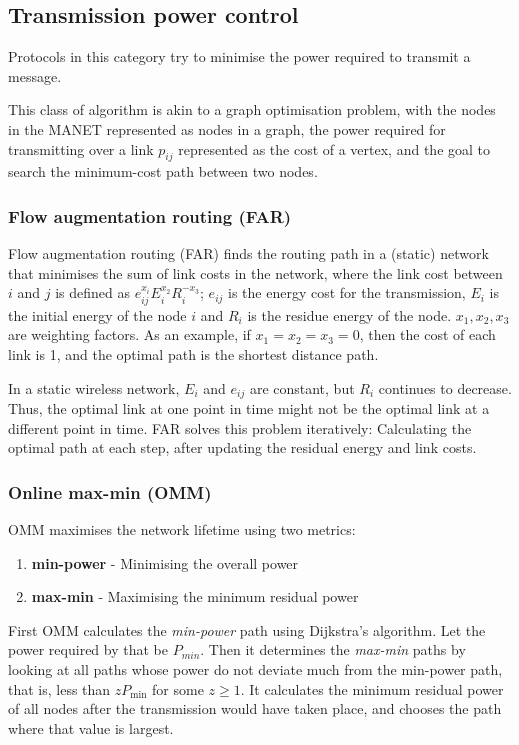 \subsection{Transmission power control}
\label{power-control}
Protocols in this category try to minimise the power required to transmit
a message.

This class of algorithm is akin to a graph optimisation problem,
with the nodes in the MANET represented as nodes in a graph, the power required for
transmitting over a link $p_{ij}$ represented as the cost of a vertex, and the goal
to search the minimum-cost path between two nodes.

\subsubsection{Flow augmentation routing (FAR)}
Flow augmentation routing (FAR)\cite{chang2000energy} finds the routing
path in a (static) network that minimises the sum of link costs in the network,
where the link cost between $i$ and $j$ is defined as \( e_{ij}^{x_{i}}E_{i}^{x_{2}}R_{i}^{-x_{3}}\);
\(e_{ij}\) is the energy cost for the transmission, $E_{i}$ is the initial energy
of the node $i$ and $R_{i}$ is the residue energy of the node. \(x_{1}, x_{2}, x_{3}\)
are weighting factors. As an example, if $x_{1}=x_{2}=x_{3}=0$, then the cost
of each link is 1, and the optimal path is the shortest distance path.

In a static wireless network, $E_{i}$ and $e_{ij}$ are constant, but $R_{i}$
continues to decrease. Thus, the optimal link at one point in time might not be the
optimal link at a different point in time. FAR solves this problem iteratively:
Calculating the optimal path at each step, after updating the residual energy
and link costs.

\subsubsection{Online max-min (OMM)}
\label{omm}
OMM \cite{li2001online} maximises the network lifetime using two metrics:
\begin{enumerate}
  \item \textbf{min-power} - Minimising the overall power
  \item \textbf{max-min} - Maximising the minimum residual power
\end{enumerate}

First OMM calculates the \textit{min-power} path using Dijkstra’s algorithm. Let
the power required by that be $P_{min}$.
Then it determines the \textit{max-min} paths by looking at all paths whose
power do not deviate much from the min-power path, that is, less than $zP_{\min}$
for some $z \ge 1$. It calculates the minimum residual power of all nodes
after the transmission would have taken place, and chooses the path where
that value is largest.

